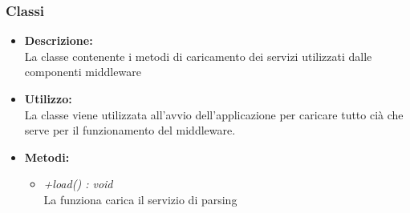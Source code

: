     \subsubsection{Classi}
        \begin{itemize}
          \item \textbf{Descrizione: }\\
          La classe contenente i metodi di caricamento dei servizi utilizzati dalle componenti middleware
          \item \textbf{Utilizzo: }\\
          La classe viene utilizzata all'avvio dell'applicazione per caricare tutto cià che serve per il funzionamento del middleware.
          \item \textbf{Metodi:}\\
          \begin{itemize}
            \item \emph{+load() : void}\\
            La funziona carica il servizio di parsing
          \end{itemize}
        \end{itemize}
